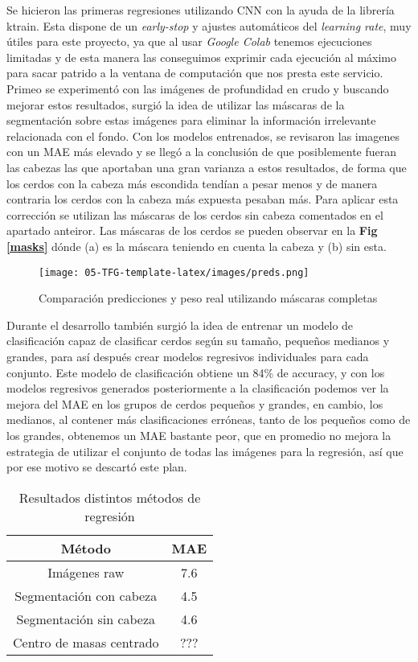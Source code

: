 \documentclass[12pt,a4paper]{article}
\begin{document}
Se hicieron las primeras regresiones utilizando CNN con la ayuda de la librería ktrain\cite{ktrain}. Esta dispone de un \textit{early-stop} y ajustes automáticos del \textit{learning rate}, muy útiles para este proyecto, ya que al usar \textit{Google Colab} tenemos ejecuciones limitadas y de esta manera las conseguimos exprimir cada ejecución al máximo para sacar patrido a la ventana de computación que nos presta este servicio.
Primeo se experimentó con las imágenes de profundidad en crudo y buscando mejorar estos resultados, surgió la idea de utilizar las máscaras de la segmentación sobre estas imágenes para eliminar la información irrelevante relacionada con el fondo.
Con los modelos entrenados, se revisaron las imagenes con un MAE\cite{mae} más elevado y se llegó a la conclusión de que posiblemente fueran las cabezas las que aportaban una gran varianza a estos resultados, de forma que los cerdos con la cabeza más escondida tendían a pesar menos y de manera contraria los cerdos con la cabeza más expuesta pesaban más. Para aplicar esta corrección se utilizan las máscaras de los cerdos sin cabeza comentados en el apartado anteiror. Las máscaras de los cerdos se pueden observar en la \textbf{Fig \ref{masks}} dónde (a) es la máscara teniendo en cuenta la cabeza y (b) sin esta.
\begin{figure}[h]
\centering
\texttt{[image: 05-TFG-template-latex/images/preds.png]}
\caption{Comparación predicciones y peso real utilizando máscaras completas}
\label{grafico}
\end{figure}
Durante el desarrollo también surgió la idea de entrenar un modelo de clasificación capaz de clasificar cerdos según su tamaño, pequeños medianos y grandes, para así después crear modelos regresivos individuales para cada conjunto. Este modelo de clasificación obtiene un 84\% de accuracy, y con los modelos regresivos generados posteriormente a la clasificación podemos ver la mejora del MAE en los grupos de cerdos pequeños y grandes, en cambio, los medianos, al contener más clasificaciones erróneas, tanto de los pequeños como de los grandes, obtenemos un MAE bastante peor, que en promedio no mejora la estrategia de utilizar el conjunto de todas las imágenes para la regresión, así que por ese motivo se descartó este plan.
\begin{table}[!]
 \centering
\begin{tabular}{|c|c|}
\hline
\textbf{Método}          & \textbf{MAE} \\ \hline
Imágenes raw             & 7.6          \\
Segmentación con cabeza  & 4.5          \\
Segmentación sin cabeza  & 4.6          \\
Centro de masas centrado & ???          \\ \hline
\end{tabular}
\caption{Resultados distintos métodos de regresión}
\label{resultados}
\end{table}
\end{document}
